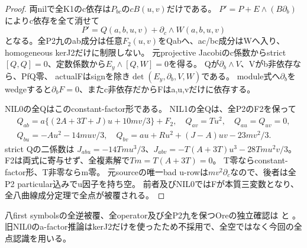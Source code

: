 \documentclass[a4paper,11pt]{ltjsarticle}
\theoremstyle{definition}
\begin{document}
\begin{proof}
両nilで全K1のc依存は$P_{bc}$の$cB(u,v)$だけである。
$P'=P+E\wedge(B\partial_b)$によりc依存を全て消せて
\[
 P'=Q(a,b,u,v)+\partial_c\wedge W(a,b,u,v)
\]
となる。全P2九のab成分は任意$F_2(u,v)$をQabへ、ac/bc成分はWへ入り、
homogeneous kerJ2だけに制限しない。
元projective Jacobiのc係数からstrict$[Q,Q]=0$、定数係数から$E_y\wedge[Q,W]=0$を得る。
Qが$\partial_b\wedge V$、Vがb非依存なら、PfQ零、
actualFはsignを除き$\det(E_y,\partial_b,V,W)$である。
module式へ$\partial_b$をwedgeすると$\partial_bF=0$、またc非依存だからFはa,u,vだけに依存する。

NIL0の全Qはこのconstant-factor形である。
NIL1の全Qは、全P2のF2を保って
\[
\begin{gathered}
 Q_{ab}=a\{(2A+3T+J)u+10mv/3\}+F_2,\quad Q_{av}=Tu^2,\quad Q_{au}=Q_{uv}=0,\\
 Q_{bu}=-Au^2-14muv/3,\quad
 Q_{bv}=au+Ru^2+(J-A)uv-23mv^2/3.
\end{gathered}
\]
strict Qの二係数は
$J_{abu}=-14Tm u^3/3$、$J_{abv}=-T(A+3T)u^3-28Tm u^2v/3$。
F2は両式に寄与せず、全複素解で$Tm=T(A+3T)=0$。
T零ならconstant-factor形、T非零ならm零。
元sourceの唯一bad u-rowは$mv^2\partial_c$なので、後者は全P2 particular込みでu因子を持ち空。
前者及びNIL0ではFが本質三変数となり、全八曲線成分定理で全点が被覆される。
\end{proof}
八first symbolsの全逆被覆、全operator及び全P2九を保つOreの独立確認は
と
。
旧NIL0のa-factor推論はkerJ2だけを使ったため不採用で、全空ではなく今回の全点認識を用いる。
\end{document}
